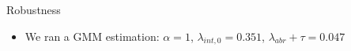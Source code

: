 \documentclass[11pt]{beamer}
\begin{document}
\begin{frame} {Robustness}
	\begin{itemize}\itemsep 6pt
		\item We ran a GMM estimation: $\alpha = 1$, $\lambda_{int, 0}= 0.351 $, $\lambda_{abr} + \tau = 0.047 $
		\begin{center}
		\begin{figure}\centering\label{Innov5}
		\end{figure}
		\end{center}
	\end{itemize}
\end{frame}
\end{document}
